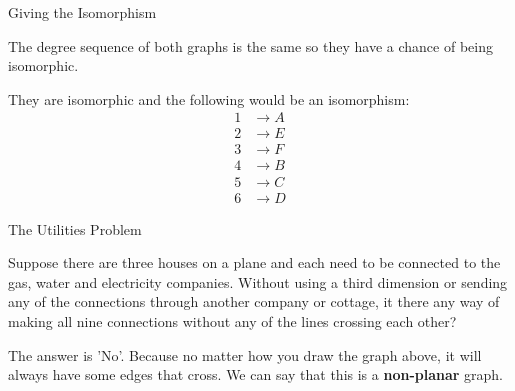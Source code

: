 \documentclass[8pt]{beamer}
\begin{document}
\begin{frame}{Giving the Isomorphism}
\begin{Problem}
\end{Problem}	

The degree sequence of both graphs is the same so they have a chance of being isomorphic.

They are isomorphic and the following would be an isomorphism:
\begin{align*}
	1 &\rightarrow A \\
	2 &\rightarrow E \\
	3 &\rightarrow F \\
	4 &\rightarrow B \\
	5 &\rightarrow C \\
	6 &\rightarrow D	
\end{align*}
\end{frame}

\begin{frame}{The Utilities Problem}
	\begin{Problem}
		Suppose there are three houses on a plane and each need to be connected to the gas, water and electricity companies. Without using a third dimension or sending any of the connections through another company or cottage, it there any way of making all nine connections without any of the lines crossing each other?

	\end{Problem}

	The answer is 'No'. Because no matter how you draw the graph above, it will always have some edges that cross. We can say that this is a \textbf{non-planar} graph. 
	
\end{frame}
\end{document}
